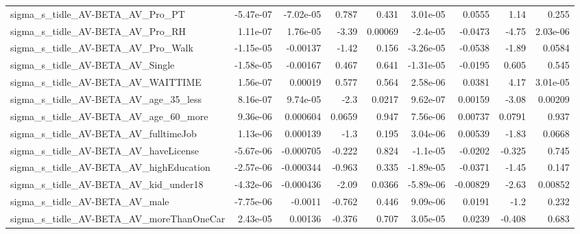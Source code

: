 \begin{tabular}{lrrrrrrrr}
sigma\_s\_tidle\_AV-BETA\_AV\_Pro\_PT                    &   -5.47e-07 &    -7.02e-05 &    0.787 &    0.431 &   3.01e-05 &      0.0555 &         1.14 &         0.255 \\
sigma\_s\_tidle\_AV-BETA\_AV\_Pro\_RH                    &    1.11e-07 &     1.76e-05 &    -3.39 &  0.00069 &   -2.4e-05 &     -0.0473 &        -4.75 &      2.03e-06 \\
sigma\_s\_tidle\_AV-BETA\_AV\_Pro\_Walk                  &   -1.15e-05 &     -0.00137 &    -1.42 &    0.156 &  -3.26e-05 &     -0.0538 &        -1.89 &        0.0584 \\
sigma\_s\_tidle\_AV-BETA\_AV\_Single                    &   -1.58e-05 &     -0.00167 &    0.467 &    0.641 &  -1.31e-05 &     -0.0195 &        0.605 &         0.545 \\
sigma\_s\_tidle\_AV-BETA\_AV\_WAITTIME                  &    1.56e-07 &      0.00019 &    0.577 &    0.564 &   2.58e-06 &      0.0381 &         4.17 &      3.01e-05 \\
sigma\_s\_tidle\_AV-BETA\_AV\_age\_35\_less               &    8.16e-07 &     9.74e-05 &     -2.3 &   0.0217 &   9.62e-07 &     0.00159 &        -3.08 &       0.00209 \\
sigma\_s\_tidle\_AV-BETA\_AV\_age\_60\_more               &    9.36e-06 &     0.000604 &   0.0659 &    0.947 &   7.56e-06 &     0.00737 &       0.0791 &         0.937 \\
sigma\_s\_tidle\_AV-BETA\_AV\_fulltimeJob               &    1.13e-06 &     0.000139 &     -1.3 &    0.195 &   3.04e-06 &     0.00539 &        -1.83 &        0.0668 \\
sigma\_s\_tidle\_AV-BETA\_AV\_haveLicense               &   -5.67e-06 &    -0.000705 &   -0.222 &    0.824 &   -1.1e-05 &     -0.0202 &       -0.325 &         0.745 \\
sigma\_s\_tidle\_AV-BETA\_AV\_highEducation             &   -2.57e-06 &    -0.000344 &   -0.963 &    0.335 &  -1.89e-05 &     -0.0371 &        -1.45 &         0.147 \\
sigma\_s\_tidle\_AV-BETA\_AV\_kid\_under18               &   -4.32e-06 &    -0.000436 &    -2.09 &   0.0366 &  -5.89e-06 &    -0.00829 &        -2.63 &       0.00852 \\
sigma\_s\_tidle\_AV-BETA\_AV\_male                      &   -7.75e-06 &      -0.0011 &   -0.762 &    0.446 &   9.09e-06 &      0.0191 &         -1.2 &         0.232 \\
sigma\_s\_tidle\_AV-BETA\_AV\_moreThanOneCar            &    2.43e-05 &      0.00136 &   -0.376 &    0.707 &   3.05e-05 &      0.0239 &       -0.408 &         0.683 \\

\end{tabular}
